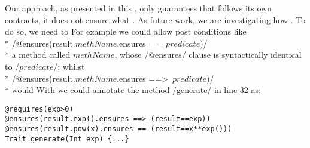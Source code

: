 Our approach, as presented in this , only guarantees that  follows its own contracts, it does
not  ensure what . As future work, we are investigating how  .
To do so, we need to 
For example we could allow post conditions like\\*
/@ensures(result.$\mathit{methName}$.ensures ==\ $\mathit{predicate}$)/ \\*
a method
called $\mathit{methName}$, whose /@ensures/ clause is syntactically identical to  /$predicate$/; whilst
\\*
/@ensures(result.$\mathit{methName}$.ensures ==>\ $\mathit{predicate}$)/
\\*
would 
With  we could annotate the method /generate/ in line 32  as:
\begin{lstlisting}
@requires(exp>0)
@ensures(result.exp().ensures ==> (result==exp))
@ensures(result.pow(x).ensures == (result==x**exp()))
Trait generate(Int exp) {...}
\end{lstlisting}

